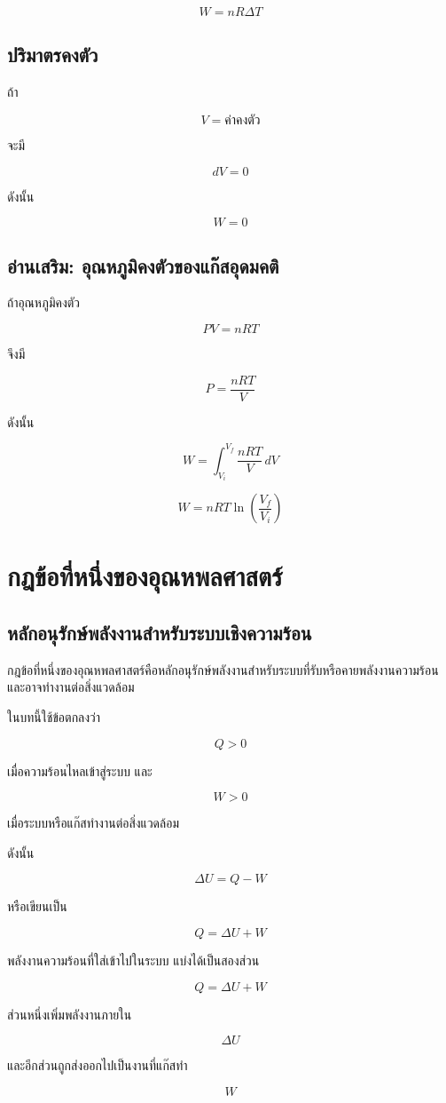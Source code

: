 \[
\boxed{W=nR\Delta T}
\]

\subsection{ปริมาตรคงตัว}

ถ้า

\[
V=\text{ค่าคงตัว}
\]

จะมี

\[
dV=0
\]

ดังนั้น

\[
\boxed{W=0}
\]

\subsection{อ่านเสริม: อุณหภูมิคงตัวของแก๊สอุดมคติ}

ถ้าอุณหภูมิคงตัว

\[
PV=nRT
\]

จึงมี

\[
P=\frac{nRT}{V}
\]

ดังนั้น

\[
W
=
\int_{V_i}^{V_f}\frac{nRT}{V}\,dV
\]

\[
\boxed{
W
=
nRT\ln\left(\frac{V_f}{V_i}\right)
}
\]

\section{กฎข้อที่หนึ่งของอุณหพลศาสตร์}

\subsection{หลักอนุรักษ์พลังงานสำหรับระบบเชิงความร้อน}

กฎข้อที่หนึ่งของอุณหพลศาสตร์คือหลักอนุรักษ์พลังงานสำหรับระบบที่รับหรือคายพลังงานความร้อน และอาจทำงานต่อสิ่งแวดล้อม

ในบทนี้ใช้ข้อตกลงว่า

\[
Q>0
\]

เมื่อความร้อนไหลเข้าสู่ระบบ และ

\[
W>0
\]

เมื่อระบบหรือแก๊สทำงานต่อสิ่งแวดล้อม

ดังนั้น

\[
\boxed{
\Delta U
=
Q-W
}
\]

หรือเขียนเป็น

\[
\boxed{
Q
=
\Delta U+W
}
\]

\begin{tcolorbox}[title=ความหมายเชิงพลังงาน]
พลังงานความร้อนที่ใส่เข้าไปในระบบ แบ่งได้เป็นสองส่วน

\[
Q
=
\Delta U+W
\]

ส่วนหนึ่งเพิ่มพลังงานภายใน

\[
\Delta U
\]

และอีกส่วนถูกส่งออกไปเป็นงานที่แก๊สทำ

\[
W
\]
\end{tcolorbox}


